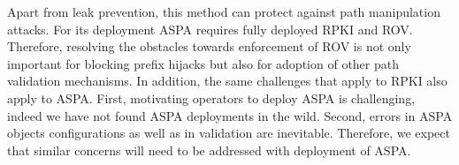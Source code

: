 {Apart from leak prevention, this method can protect against path manipulation attacks. For its deployment ASPA requires fully deployed RPKI and ROV. Therefore, resolving the obstacles towards enforcement of ROV is not only important for blocking prefix hijacks but also for adoption of other path validation mechanisms. In addition, the same challenges that apply to RPKI also apply to ASPA. First, motivating operators to deploy ASPA is challenging, indeed we have not found ASPA deployments in the wild. Second, errors in ASPA objects configurations as well as in validation are inevitable. Therefore, we expect that similar concerns will need to be addressed with deployment of ASPA. 


}
